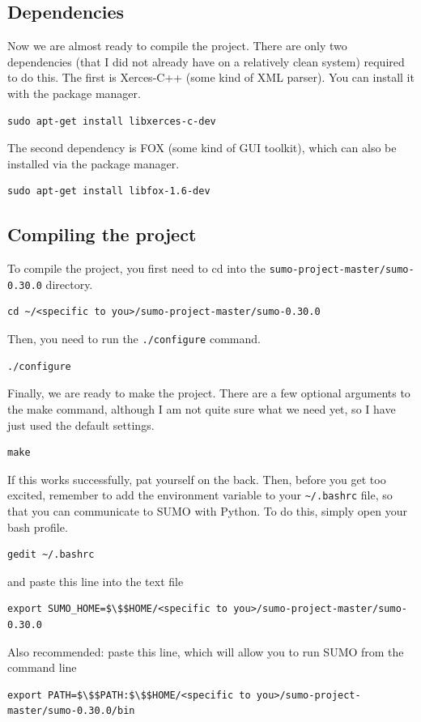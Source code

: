 \documentclass[11pt,nofootinbib]{revtex4}
\begin{document}
\subsection{Dependencies}
Now we are almost ready to compile the project. There are only two dependencies (that I did not already have on a relatively clean system) required to do this. The first is Xerces-C++ (some kind of XML parser). You can install it with the package manager. 
\begin{lstlisting}
sudo apt-get install libxerces-c-dev
\end{lstlisting}
 The second dependency is FOX (some kind of GUI toolkit), which can also be installed via the package manager.
\begin{lstlisting}
sudo apt-get install libfox-1.6-dev
\end{lstlisting}

\subsection{Compiling the project}
To compile the project, you first need to cd into the \verb|sumo-project-master/sumo-0.30.0| directory.
\begin{lstlisting}
cd ~/<specific to you>/sumo-project-master/sumo-0.30.0
\end{lstlisting}
Then, you need to run the \verb|./configure| command.
\begin{lstlisting}
./configure
\end{lstlisting}
Finally, we are ready to make the project. There are a few optional arguments to the make command, although I am not quite sure what we need yet, so I have just used the default settings.
\begin{lstlisting}
make
\end{lstlisting}

If this works successfully, pat yourself on the back. Then, before you get too excited, remember to add the environment variable to your \verb|~/.bashrc| file, so that you can communicate to SUMO with Python. To do this, simply open your bash profile. 
\begin{lstlisting}
gedit ~/.bashrc
\end{lstlisting}
and paste this line into the text file
\begin{lstlisting}
export SUMO_HOME=$\$$HOME/<specific to you>/sumo-project-master/sumo-0.30.0
\end{lstlisting}
Also recommended: paste this line, which will allow you to run SUMO from the command line
\begin{lstlisting}
export PATH=$\$$PATH:$\$$HOME/<specific to you>/sumo-project-master/sumo-0.30.0/bin
\end{lstlisting}
\end{document}
